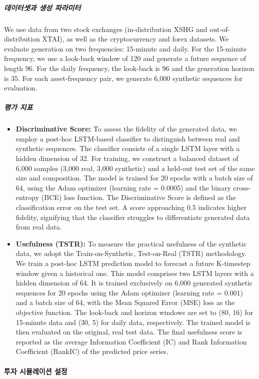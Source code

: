 \subparagraph{데이터셋과 생성 파라미터} We use data from two stock exchanges (in-distribution XSHG and out-of-distribution XTAI), as well as the cryptocurrency and forex datasets. We evaluate generation on two frequencies: 15-minute and daily. For the 15-minute frequency, we use a look-back window of 120 and generate a future sequence of length 96. For the daily frequency, the look-back is 96 and the generation horizon is 35. For each asset-frequency pair, we generate 6,000 synthetic sequences for evaluation.

\subparagraph{평가 지표}
\begin{itemize}
    \item \textbf{Discriminative Score:} To assess the fidelity of the generated data, we employ a post-hoc LSTM-based classifier to distinguish between real and synthetic sequences. The classifier consists of a single LSTM layer with a hidden dimension of 32. For training, we construct a balanced dataset of 6,000 samples (3,000 real, 3,000 synthetic) and a held-out test set of the same size and composition. The model is trained for 20 epochs with a batch size of 64, using the Adam optimizer (learning rate = 0.0005) and the binary cross-entropy (BCE) loss function. The Discriminative Score is defined as the classification error on the test set. A score approaching 0.5 indicates higher fidelity, signifying that the classifier struggles to differentiate generated data from real data.

    \item \textbf{Usefulness (TSTR):} To measure the practical usefulness of the synthetic data, we adopt the Train-on-Synthetic, Test-on-Real (TSTR) methodology. We train a post-hoc LSTM prediction model to forecast a future K-timestep window given a historical one. This model comprises two LSTM layers with a hidden dimension of 64. It is trained exclusively on 6,000 generated synthetic sequences for 20 epochs using the Adam optimizer (learning rate = 0.001) and a batch size of 64, with the Mean Squared Error (MSE) loss as the objective function. The look-back and horizon windows are set to (80, 16) for 15-minute data and (30, 5) for daily data, respectively. The trained model is then evaluated on the original, real test data. The final usefulness score is reported as the average Information Coefficient (IC) and Rank Information Coefficient (RankIC) of the predicted price series.
\end{itemize}

\paragraph{투자 시뮬레이션 설정}

